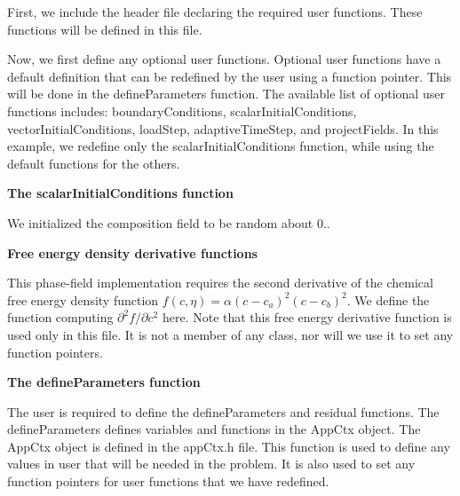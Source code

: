 First, we include the header file declaring the required user functions. These functions will be defined in this file.


\begin{DoxyCodeInclude}

\end{DoxyCodeInclude}


Now, we first define any optional user functions. Optional user functions have a default definition that can be redefined by the user using a function pointer. This will be done in the {\ttfamily define\-Parameters} function. The available list of optional user functions includes\-: {\ttfamily boundary\-Conditions}, {\ttfamily scalar\-Initial\-Conditions}, {\ttfamily vector\-Initial\-Conditions}, {\ttfamily load\-Step}, {\ttfamily adaptive\-Time\-Step}, and {\ttfamily project\-Fields}. In this example, we redefine only the {\ttfamily scalar\-Initial\-Conditions} function, while using the default functions for the others.

{\bfseries  The {\ttfamily scalar\-Initial\-Conditions} function }

We initialized the composition field to be random about 0..


\begin{DoxyCodeInclude}

\end{DoxyCodeInclude}


{\bfseries  Free energy density derivative functions }

This phase-\/field implementation requires the second derivative of the chemical free energy density function $f(c,\eta) = \alpha(c - c_a)^2(c - c_b)^2$. We define the function computing $\partial^2 f/\partial c^2$ here. Note that this free energy derivative function is used only in this file. It is not a member of any class, nor will we use it to set any function pointers.


\begin{DoxyCodeInclude}

\end{DoxyCodeInclude}


{\bfseries  The {\ttfamily define\-Parameters} function }

The user is required to define the {\ttfamily define\-Parameters} and {\ttfamily residual} functions. The {\ttfamily define\-Parameters} defines variables and functions in the {\ttfamily App\-Ctx} object. The {\ttfamily App\-Ctx} object is defined in the app\-Ctx.\-h file. This function is used to define any values in {\ttfamily user} that will be needed in the problem. It is also used to set any function pointers for user functions that we have redefined.

